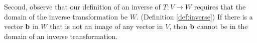 \documentclass{ximera}
\renewcommand{\vec}[1]{{\bf #1}}
\begin{document}
\begin{center}
\quad
{}
\end{center}

Second, observe that our definition of an inverse of $T:V\rightarrow W$ requires that the domain of the inverse transformation be $W$. (Definition \ref{def:inverse})  If there is a vector $\vec{b}$ in $W$ that is not an image of any vector in $V$, then $\vec{b}$ cannot be in the domain of an inverse transformation. %

\begin{center}
\quad\quad
{}\quad
  \label{fig:notonto} 
\end{center}
\end{document}
